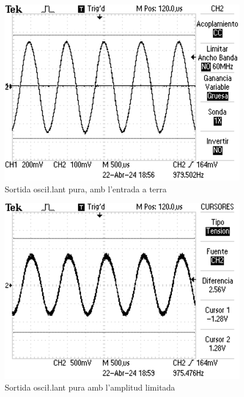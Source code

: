 \documentclass[catalan, a4paper, nobib]{tufte-handout}
\begin{document}
\newpage

\begin{figure}[!h]
    \begin{center}
        \includegraphics[width=400px]{L7_3.png}
    \end{center}
    \caption{Sortida osci\l.lant pura, amb l'entrada a terra}
    \label{fig:metaestable_pur}
\end{figure}

\begin{figure}[!h]
    \begin{center}
        \includegraphics[width=400px]{L8.png}
    \end{center}
    \caption{Sortida osci\l.lant pura amb l'amplitud limitada}
    \label{fig:metaestable_limitat}
\end{figure}


\end{document}
